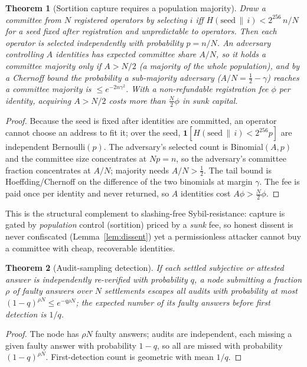 \documentclass[11pt]{article}
\newtheorem{theorem}{Theorem}
\begin{document}
\begin{theorem}[Sortition capture requires a population majority]
\label{thm:sortition}
Draw a committee from $N$ registered operators by selecting $i$ iff $H(\mathrm{seed}\,\|\,i)<2^{256}\,n/N$ for a seed fixed after registration and unpredictable to operators. Then each operator is selected independently with probability $p=n/N$. An adversary controlling $A$ identities has expected committee share $A/N$, so it holds a committee majority only if $A>N/2$ (a majority of the whole population), and by a Chernoff bound the probability a sub-majority adversary ($A/N=\tfrac12-\gamma$) reaches a committee majority is $\le e^{-2n\gamma^2}$. With a non-refundable registration fee $\phi$ per identity, acquiring $A>N/2$ costs more than $\tfrac{N}{2}\phi$ in sunk capital.
\end{theorem}
\begin{proof}
Because the seed is fixed after identities are committed, an operator cannot choose an address to fit it; over the seed, $\mathbf 1[H(\mathrm{seed}\,\|\,i)<2^{256}p]$ are independent Bernoulli$(p)$. The adversary's selected count is Binomial$(A,p)$ and the committee size concentrates at $Np=n$, so the adversary's committee fraction concentrates at $A/N$; majority needs $A/N>\tfrac12$. The tail bound is Hoeffding/Chernoff on the difference of the two binomials at margin $\gamma$. The fee is paid once per identity and never returned, so $A$ identities cost $A\phi>\tfrac N2\phi$.
\end{proof}

\noindent This is the structural complement to slashing-free Sybil-resistance: capture is gated by \emph{population} control (sortition) priced by a \emph{sunk} fee, so honest dissent is never confiscated (Lemma~\ref{lem:dissent}) yet a permissionless attacker cannot buy a committee with cheap, recoverable identities.

\begin{theorem}[Audit-sampling detection]
\label{thm:audit}
If each settled subjective or attested answer is independently re-verified with probability $q$, a node submitting a fraction $\rho$ of faulty answers over $N$ settlements escapes all audits with probability at most $(1-q)^{\rho N}\le e^{-q\rho N}$; the expected number of its faulty answers before first detection is $1/q$.
\end{theorem}
\begin{proof}
The node has $\rho N$ faulty answers; audits are independent, each missing a given faulty answer with probability $1-q$, so all are missed with probability $(1-q)^{\rho N}$. First-detection count is geometric with mean $1/q$.
\end{proof}
\end{document}
